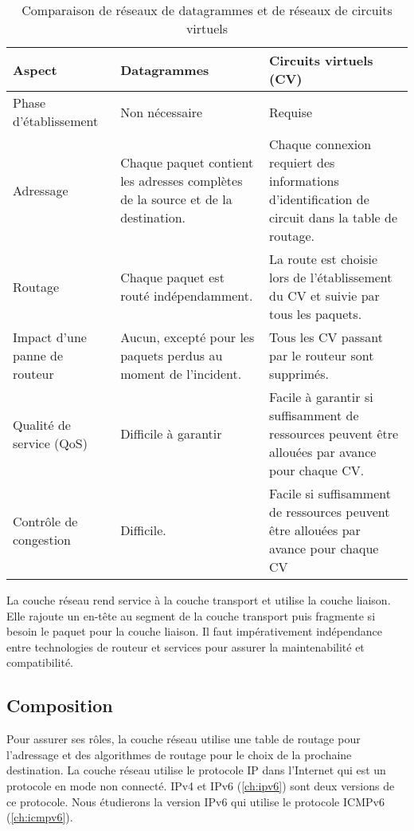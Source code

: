 			\begin{table}[H]
			\centering
			\label{MNC_MC}
			\begin{tabular}{|p{4cm}|p{5cm}|p{5cm}|}
			\hline
			\textbf{Aspect}               & \textbf{Datagrammes}                                                             & \textbf{Circuits virtuels (CV)}                                                                  \\ \hline
			Phase d'établissement         & Non nécessaire                                                                   & Requise                                                                                          \\ \hline
			Adressage                     & Chaque paquet contient les adresses complètes de la source et de la destination. & Chaque connexion requiert des informations d'identification de circuit dans la table de routage. \\ \hline
			Routage                       & Chaque paquet est routé indépendamment.                                          & La route est choisie lors de l'établissement du CV et suivie par tous les paquets.               \\ \hline
			Impact d'une panne de routeur & Aucun, excepté pour les paquets perdus au moment de l'incident.                  & Tous les CV passant par le routeur sont supprimés.                                               \\ \hline
			Qualité de service (QoS)      & Difficile à garantir                                                             & Facile à garantir si suffisamment de ressources peuvent être allouées par avance pour chaque CV. \\ \hline
			Contrôle de congestion        & Difficile.                                                                       & Facile si suffisamment de ressources peuvent être allouées par avance pour chaque CV             \\ \hline
			\end{tabular}
			\caption{Comparaison de réseaux de datagrammes et de réseaux de circuits virtuels \cite{Tanenbaum2003}}
			\end{table}
       
		La couche réseau rend service à la couche transport et utilise la couche liaison.
		Elle rajoute un en-tête au segment de la couche transport puis fragmente si besoin le paquet pour la couche liaison. Il faut impérativement indépendance entre technologies de routeur et services pour assurer la maintenabilité et compatibilité.

	\subsection{Composition}
Pour assurer ses rôles, la couche réseau utilise une table de routage pour l’adressage et des algorithmes de routage pour le choix de la prochaine destination. 
	\newline
		La couche réseau utilise le protocole IP dans l'Internet qui est un protocole en mode non connecté. IPv4 et IPv6 (\ref{ch:ipv6}) sont deux versions de ce protocole. Nous étudierons la version IPv6 qui utilise le protocole ICMPv6 (\ref{ch:icmpv6}).